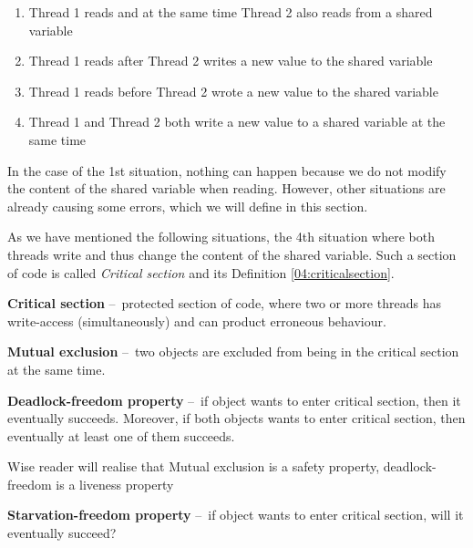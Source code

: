 \begin{enumerate}[itemsep=1mm, parsep=0pt]
    \item Thread 1 reads and at the same time Thread 2 also reads from a shared variable
    \item Thread 1 reads after Thread 2 writes a new value to the shared variable
    \item Thread 1 reads before Thread 2 wrote a new value to the shared variable
    \item Thread 1 and Thread 2 both write a new value to a shared variable at the same time
\end {enumerate}

In the case of the 1st situation, nothing can happen because we do not modify the content of the shared variable when reading. However, other situations are already causing some errors, which we will define in this section.

As we have mentioned the following situations, the 4th situation where both threads write and thus change the content of the shared variable. Such a section of code is called \emph{Critical section} and its Definition \ref{04:criticalsection}.

\begin{definition}
    \label{04:criticalsection}
  \textbf{Critical section} \---\ protected section of code, where two or more threads has write-access (simultaneously) and can product erroneous behaviour.
\end{definition}

\begin{definition}
  \textbf{Mutual exclusion} \---\ two objects are excluded from being in the critical section at the same time. 
\end{definition}

\begin{definition}
  \textbf{Deadlock-freedom property} \---\  if object wants to enter critical section, then it eventually succeeds. Moreover, if both objects wants to enter critical section, then eventually at least one of them succeeds.  
\end{definition}

Wise reader will realise that Mutual exclusion is a safety property, deadlock-freedom is a liveness property

\begin{definition}
  \textbf{Starvation-freedom property} \---\   if object wants to enter critical section, will it eventually succeed?   
\end{definition}


